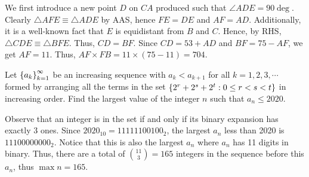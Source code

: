 \begin{center}
\end{center}

We first introduce a new point $D$ on $CA$ produced such that $\angle ADE = 90\deg$. Clearly $\triangle AFE \equiv \triangle ADE$ by AAS, hence $FE = DE$ and $AF = AD$. Additionally, it is a well-known fact that $E$ is equidistant from $B$ and $C$. Hence, by RHS, $\triangle CDE \equiv \triangle BFE$. Thus, $CD = BF$. Since $CD = 53 + AD$ and $BF = 75 - AF$, we get $AF = 11$. Thus, $AF \times FB = 11 \times (75 - 11) = 704$.

\begin{question}[165]\label{A::2020-O-1-22}
    Let $\left\lbrace a_k \right\rbrace_{k=1}^\infty$ be an increasing sequence with $a_k < a_{k+1}$ for all $k = 1, 2, 3, \cdots$ formed by arranging all the terms in the set $\left\lbrace 2^r + 2^s + 2^t : 0 \leq r < s < t \right\rbrace$ in increasing order. Find the largest value of the integer $n$ such that $a_n \leq 2020$.
\end{question}

Observe that an integer is in the set if and only if its binary expansion has exactly 3 ones. Since $2020_{10} = 11111100100_{2}$, the largest $a_n$ less than 2020 is $11100000000_{2}$. Notice that this is also the largest $a_n$ where $a_n$ has 11 digits in binary. Thus, there are a total of $\binom{11}{3} = 165$ integers in the sequence before this $a_n$, thus $\max n = 165$.

